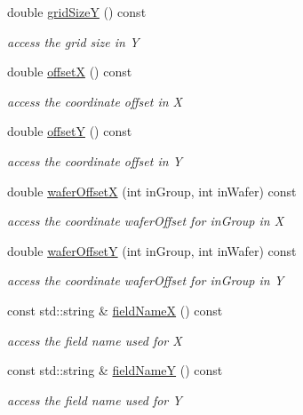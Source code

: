 \begin{DoxyCompactItemize}
double \hyperlink{class_d_d4hep_1_1_geometry_1_1_wafer_grid_x_y_a3f50027f933a814afa1005bb75bb9f61}{grid\+SizeY} () const
\begin{DoxyCompactList}\small\item\em access the grid size in Y \end{DoxyCompactList}\item 
double \hyperlink{class_d_d4hep_1_1_geometry_1_1_wafer_grid_x_y_a5d167f1d6c861c027eaecf8079f3d89d}{offsetX} () const
\begin{DoxyCompactList}\small\item\em access the coordinate offset in X \end{DoxyCompactList}\item 
double \hyperlink{class_d_d4hep_1_1_geometry_1_1_wafer_grid_x_y_a798ebe4f6079a63a05987148f5c61edb}{offsetY} () const
\begin{DoxyCompactList}\small\item\em access the coordinate offset in Y \end{DoxyCompactList}\item 
double \hyperlink{class_d_d4hep_1_1_geometry_1_1_wafer_grid_x_y_a9af760dcaf08746a829dc9ce75a80ae9}{wafer\+OffsetX} (int in\+Group, int in\+Wafer) const
\begin{DoxyCompactList}\small\item\em access the coordinate wafer\+Offset for in\+Group in X \end{DoxyCompactList}\item 
double \hyperlink{class_d_d4hep_1_1_geometry_1_1_wafer_grid_x_y_aa20b7b55b5a57dc9d8bf7d8df94a1108}{wafer\+OffsetY} (int in\+Group, int in\+Wafer) const
\begin{DoxyCompactList}\small\item\em access the coordinate wafer\+Offset for in\+Group in Y \end{DoxyCompactList}\item 
const std\+::string \& \hyperlink{class_d_d4hep_1_1_geometry_1_1_wafer_grid_x_y_a9fb866a3ebbae07ab7c1c9523310bfa4}{field\+NameX} () const
\begin{DoxyCompactList}\small\item\em access the field name used for X \end{DoxyCompactList}\item 
const std\+::string \& \hyperlink{class_d_d4hep_1_1_geometry_1_1_wafer_grid_x_y_a396ef50a82a36b0a872193f8bc7c927e}{field\+NameY} () const
\begin{DoxyCompactList}\small\item\em access the field name used for Y \end{DoxyCompactList}\item 

\end{DoxyCompactItemize}
